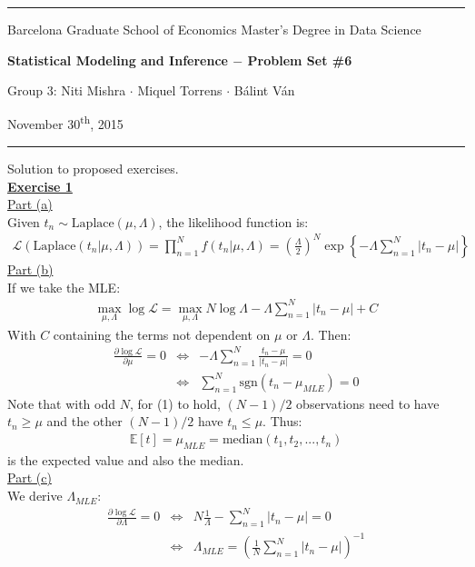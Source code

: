 \documentclass[a4paper, 11pt]{article}
\newcommand{\header}[4]{
	\begin{center}
		\rule{\linewidth}{0.5pt}
		
		{\small{#1}}
      
        \vspace{0.2in}
        
		{\large{#2}}
		
        \vspace{0.2in}
        
		{\small{#3}}
		
		\vspace{0.15in}
		
		{#4}
		
		\vspace{-0.1in}
		\rule{\linewidth}{0.6pt}
	\end{center}
}
\begin{document}
 
\header{\sc Barcelona Graduate School of Economics \hfill Master's Degree in Data Science}{\bf Statistical Modeling and Inference $-$ Problem Set \#6}{\sc Group 3: Niti Mishra $\cdot$ Miquel Torrens $\cdot$ B\'alint V\'an}{November 30\textsuperscript{th}, 2015}
Solution to proposed exercises.\\
\newline \textbf{\underline{Exercise 1}}\\
\newline \underline{Part (a)}\\
\newline Given $t_n \sim \text{Laplace}(\mu, \Lambda)$, the likelihood function is:
\begin{eqnarray}
\mathcal{L} (\text{Laplace} (t_n | \mu, \Lambda)) = \prod_{n=1}^{N} f(t_n | \mu, \Lambda) = \left(  \frac{\Lambda}{2} \right)^N \exp \left\{ -\Lambda \sum_{n=1}^{N} | t_n - \mu | \right\} \nonumber
\end{eqnarray}
\newline \underline{Part (b)}\\
\newline If we take the MLE:
\begin{eqnarray}
\max_{\mu, \Lambda} \log \mathcal{L} = \max_{\mu, \Lambda} N \log \Lambda - \Lambda  \sum_{n=1}^{N} | t_n - \mu | + C  \nonumber
\end{eqnarray}
With $C$ containing the terms not dependent on $\mu$ or $\Lambda$. Then:
\begin{eqnarray}
\frac{\partial \log \mathcal{L}}{\partial \mu} = 0 &\Leftrightarrow& - \Lambda \sum_{n=1}^{N} \frac{ t_n - \mu }{| t_n - \mu |} = 0 \nonumber \\
&\Leftrightarrow& \sum_{n=1}^{N} \text{sgn}(t_n - \mu_{MLE}) = 0 
\end{eqnarray}
Note that with odd $N$, for (1) to hold, $(N-1)/2$ observations need to have $t_n \geq \mu$ and the other $(N-1)/2$ have $t_n \leq \mu$. Thus:
\begin{eqnarray}
\mathbb{E}[t] = \mu_{MLE} = \text{median}(t_1, t_2, ..., t_n) \nonumber
\end{eqnarray}
is the expected value and also the median.\\
\newline \underline{Part (c)}\\
\newline We derive $\Lambda_{MLE}$:
\begin{eqnarray}
\frac{\partial \log \mathcal{L}}{\partial \Lambda} = 0 &\Leftrightarrow& N \frac{1}{\Lambda} - \sum_{n=1}^{N} | t_n - \mu | = 0 \nonumber \\
&\Leftrightarrow& \Lambda_{MLE} = \left( \frac{1}{N} \sum_{n=1}^{N} | t_n - \mu | \right)^{-1}  \nonumber
\end{eqnarray}
\end{document}
